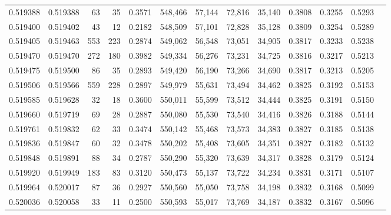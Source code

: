 \begin{tabular}{rrrrrrrrrrrrr}
0.519388 & 0.519388 &    63 &    35 &                                     0.3571 & 548,466 &  57,144 &  72,816 &  35,140 & 0.3808 & 0.3255 & 0.5293 \\
0.519400 & 0.519402 &    43 &    12 &                                     0.2182 & 548,509 &  57,101 &  72,828 &  35,128 & 0.3809 & 0.3254 & 0.5289 \\
0.519405 & 0.519463 &   553 &   223 &                                     0.2874 & 549,062 &  56,548 &  73,051 &  34,905 & 0.3817 & 0.3233 & 0.5238 \\
0.519470 & 0.519470 &   272 &   180 &                                     0.3982 & 549,334 &  56,276 &  73,231 &  34,725 & 0.3816 & 0.3217 & 0.5213 \\
0.519475 & 0.519500 &    86 &    35 &                                     0.2893 & 549,420 &  56,190 &  73,266 &  34,690 & 0.3817 & 0.3213 & 0.5205 \\
0.519506 & 0.519566 &   559 &   228 &                                     0.2897 & 549,979 &  55,631 &  73,494 &  34,462 & 0.3825 & 0.3192 & 0.5153 \\
0.519585 & 0.519628 &    32 &    18 &                                     0.3600 & 550,011 &  55,599 &  73,512 &  34,444 & 0.3825 & 0.3191 & 0.5150 \\
0.519660 & 0.519719 &    69 &    28 &                                     0.2887 & 550,080 &  55,530 &  73,540 &  34,416 & 0.3826 & 0.3188 & 0.5144 \\
0.519761 & 0.519832 &    62 &    33 &                                     0.3474 & 550,142 &  55,468 &  73,573 &  34,383 & 0.3827 & 0.3185 & 0.5138 \\
0.519836 & 0.519847 &    60 &    32 &                                     0.3478 & 550,202 &  55,408 &  73,605 &  34,351 & 0.3827 & 0.3182 & 0.5132 \\
0.519848 & 0.519891 &    88 &    34 &                                     0.2787 & 550,290 &  55,320 &  73,639 &  34,317 & 0.3828 & 0.3179 & 0.5124 \\
0.519920 & 0.519949 &   183 &    83 &                                     0.3120 & 550,473 &  55,137 &  73,722 &  34,234 & 0.3831 & 0.3171 & 0.5107 \\
0.519964 & 0.520017 &    87 &    36 &                                     0.2927 & 550,560 &  55,050 &  73,758 &  34,198 & 0.3832 & 0.3168 & 0.5099 \\
0.520036 & 0.520058 &    33 &    11 &                                     0.2500 & 550,593 &  55,017 &  73,769 &  34,187 & 0.3832 & 0.3167 & 0.5096 \\

\end{tabular}
